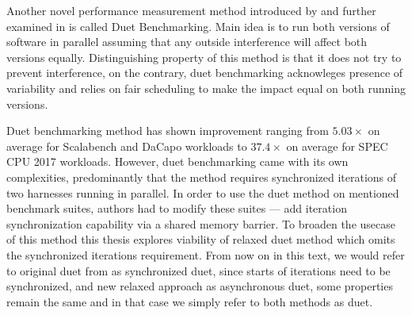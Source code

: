 Another novel performance measurement method introduced by \citet{bulej2019initial} and further examined in \citet{bulej2020duet} is called Duet Benchmarking.
Main idea is to run both versions of software in parallel assuming that any outside interference will affect both versions equally. 
Distinguishing property of this method is that it does not try to prevent interference, on the contrary, duet benchmarking acknowleges presence of variability and relies on fair scheduling to make the impact equal on both running versions.

Duet benchmarking method has shown improvement ranging from $5.03 \times$ on average for Scalabench and DaCapo workloads to $37.4 \times$ on average for SPEC CPU 2017 workloads.
However, duet benchmarking came with its own complexities, predominantly that the method requires synchronized iterations of two harnesses running in parallel.
In order to use the duet method on mentioned benchmark suites, authors had to modify these suites --- add iteration synchronization capability via a shared memory barrier.
To broaden the usecase of this method this thesis explores viability of relaxed duet method which omits the synchronized iterations requirement.
From now on in this text, we would refer to original duet from \citet{bulej2020duet} as synchronized duet, since starts of iterations need to be synchronized, and new relaxed approach as asynchronous duet, some properties remain the same and in that case we simply refer to both methods as duet.

